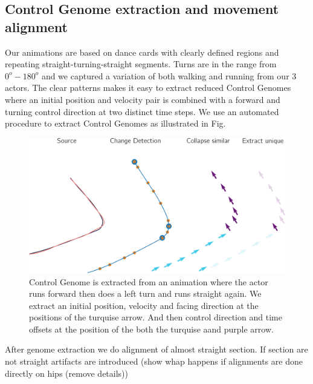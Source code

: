 \subsection{Control Genome extraction and movement alignment}
Our animations are based on dance cards with clearly defined regions and repeating straight-turning-straight segments. Turns are in the range from $0^o-180^o$ and we captured a variation of both walking and running from our 3 actors. The clear patterns makes it easy to extract reduced Control Genomes where an initial position and velocity pair is combined with a forward and turning control direction at two distinct time steps. We use an automated procedure to extract Control Genomes as illustrated in Fig.      
\begin{figure}
    \centering
    \includegraphics[width=1.0\columnwidth]{img/genome_extract.png}
    \caption{Control Genome is extracted from an animation where the actor runs forward then does a left turn and runs straight again. We extract an initial position, velocity and facing direction at the positions of the turquise arrow. And then control direction and time offsets at the position of the both the turquise aand purple arrow.}
    \label{fig:results:genome_extraction}
\end{figure}
After genome extraction we do alignment of almost straight section. If section are not straight artifacts are introduced (show whap happens if alignments are done directly on hips (remove details))


